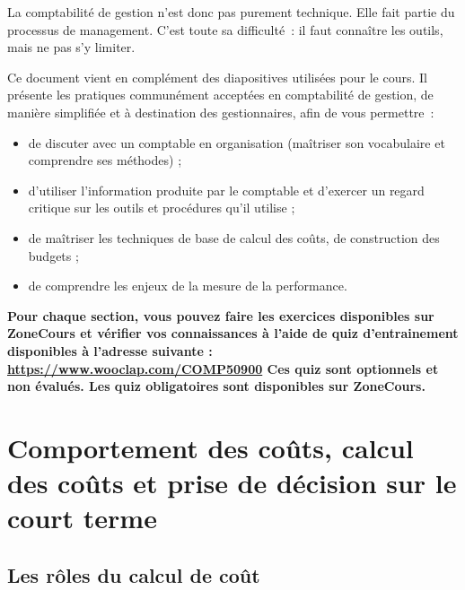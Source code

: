 \documentclass[oneside]{kaobook}
\begin{document}
La comptabilité de gestion n'est donc pas purement technique. Elle fait partie du processus de management. C'est toute sa difficulté : il faut connaître les outils, mais ne pas s'y limiter.


\begin{kaobox}
Ce document vient en complément des diapositives utilisées pour le cours. Il présente les pratiques communément acceptées en comptabilité de gestion, de manière simplifiée et à destination des gestionnaires, afin de vous permettre :
\begin{itemize}
\item de discuter avec un comptable en organisation (maîtriser son vocabulaire et comprendre ses méthodes) ;
\item d'utiliser l’information produite par le comptable et d'exercer un regard critique sur les outils et procédures qu’il utilise ;
\item de maîtriser les techniques de base de calcul des coûts, de construction des budgets ;
\item de comprendre les enjeux de la mesure de la performance.
\end{itemize}
\textbf{Pour chaque section, vous pouvez faire les exercices disponibles sur ZoneCours et vérifier vos connaissances à l'aide de quiz d’entrainement disponibles à l'adresse suivante : \url{https://www.wooclap.com/COMP50900} 
Ces quiz sont optionnels et non évalués. Les quiz obligatoires sont disponibles sur ZoneCours.}
\end{kaobox}

\chapter{Comportement des coûts, calcul des coûts et prise de décision sur le court terme}
\label{sec:org6d2c4f4}
\section{Les rôles du calcul de coût}
\label{sec:org993205b}
\end{document}
